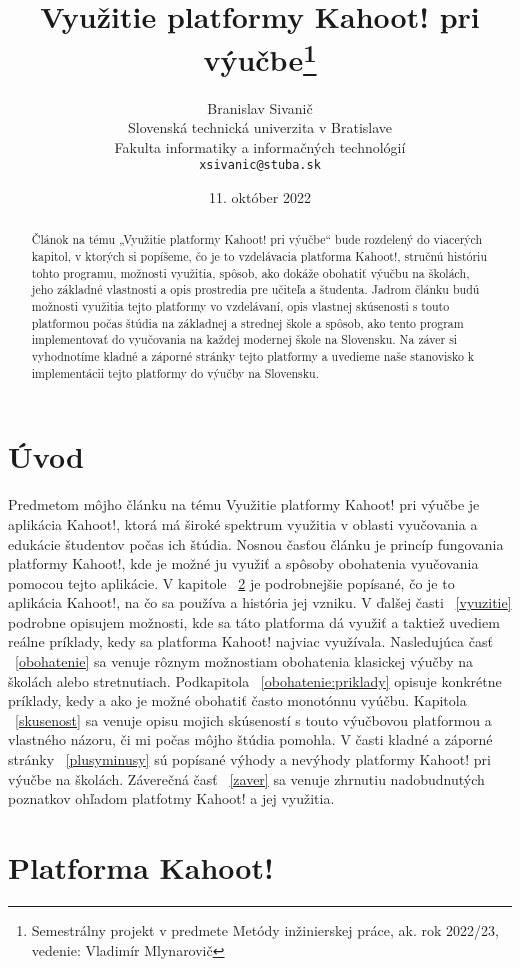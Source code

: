 \documentclass[10pt,twoside,slovak,a4paper]{article}
\title{Využitie platformy Kahoot! pri výučbe\thanks{Semestrálny projekt v predmete Metódy inžinierskej práce, ak. rok 2022/23, vedenie: Vladimír Mlynarovič}} %
\author{Branislav Sivanič\\[2pt]
	{\small Slovenská technická univerzita v Bratislave}\\
	{\small Fakulta informatiky a informačných technológií}\\
	{\small \texttt{xsivanic@stuba.sk}}
	}
\date{\small 11. október 2022} %
\begin{document}
\maketitle

\begin{abstract}
Článok na tému „Využitie platformy Kahoot! pri výučbe“ bude rozdelený do viacerých kapitol, v ktorých si popíšeme, čo je to vzdelávacia platforma Kahoot!, stručnú históriu tohto programu, možnosti využitia, spôsob, ako dokáže obohatiť výučbu na školách, jeho základné vlastnosti a opis prostredia pre učiteľa a študenta. Jadrom článku budú možnosti využitia tejto platformy vo vzdelávaní, opis vlastnej skúsenosti s touto platformou počas štúdia na základnej a strednej škole a spôsob, ako tento program implementovať do vyučovania na každej modernej škole na Slovensku. Na záver si vyhodnotíme kladné a záporné stránky tejto platformy a uvedieme naše stanovisko k implementácii tejto platformy do výučby na Slovensku.
\end{abstract}



\section{Úvod}
Predmetom môjho článku na tému Využitie platformy Kahoot! pri výučbe je aplikácia Kahoot!, ktorá má široké spektrum využitia v oblasti vyučovania a edukácie študentov počas ich štúdia. Nosnou časťou článku je princíp fungovania platformy Kahoot!, kde je možné ju využiť a spôsoby obohatenia vyučovania pomocou tejto aplikácie. V kapitole ~\ref{kahoot} je podrobnejšie popísané, čo je to aplikácia Kahoot!, na čo sa používa a história jej vzniku. V ďalšej časti ~\ref{vyuzitie} podrobne opisujem možnosti, kde sa táto platforma dá využiť a taktiež uvediem reálne príklady, kedy sa platforma Kahoot! najviac využívala. Nasledujúca časť ~\ref{obohatenie} sa venuje rôznym možnostiam obohatenia klasickej výučby na školách alebo stretnutiach. Podkapitola ~\ref{obohatenie:priklady} opisuje konkrétne príklady, kedy a ako je možné obohatiť často monotónnu vyúčbu. Kapitola ~\ref{skusenost} sa venuje opisu mojich skúseností s touto výučbovou platformou a vlastného názoru, či mi počas môjho štúdia pomohla. V časti kladné a záporné stránky ~\ref{plusyminusy} sú popísané výhody a nevýhody platformy Kahoot! pri výučbe na školách. Záverečná časť ~\ref{zaver} sa venuje zhrnutiu nadobudnutých poznatkov ohľadom platfotmy Kahoot! a jej využitia.


\section{Platforma Kahoot!} \label{kahoot}
\end{document}
